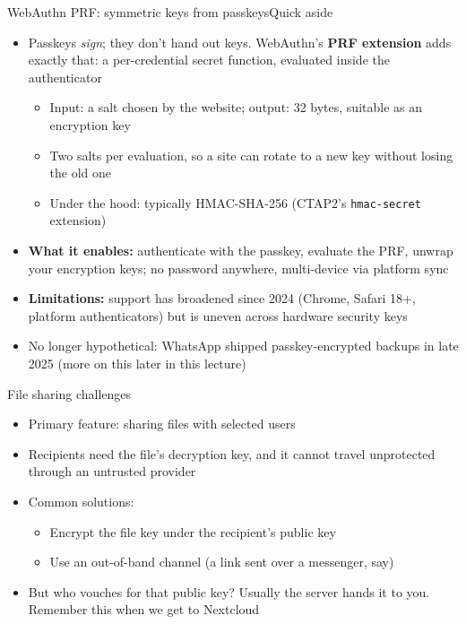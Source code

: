 \ifdefined\PRESENTATION\else\PassOptionsToClass{handout}{beamer}\fi\documentclass[aspectratio=169, lualatex]{beamer}
\begin{document}
\begin{frame}{WebAuthn PRF: symmetric keys from passkeys}{Quick aside}
	\begin{itemize}
		\item Passkeys \textit{sign}; they don't hand out keys. WebAuthn's \textbf{PRF extension} adds exactly that: a per-credential secret function, evaluated inside the authenticator
		      \begin{itemize}
			      \item Input: a salt chosen by the website; output: 32 bytes, suitable as an encryption key
			      \item Two salts per evaluation, so a site can rotate to a new key without losing the old one
			      \item Under the hood: typically HMAC-SHA-256 (CTAP2's \texttt{hmac-secret} extension)
		      \end{itemize}
		\item \textbf{What it enables:} authenticate with the passkey, evaluate the PRF, unwrap your encryption keys; no password anywhere, multi-device via platform sync
		\item \textbf{Limitations:} support has broadened since 2024 (Chrome, Safari 18+, platform authenticators) but is uneven across hardware security keys
		\item No longer hypothetical: WhatsApp shipped passkey-encrypted backups in late 2025 (more on this later in this lecture)
	\end{itemize}
\end{frame}

\begin{frame}{File sharing challenges}
	\begin{itemize}
		\item Primary feature: sharing files with selected users
		\item Recipients need the file's decryption key, and it cannot travel unprotected through an untrusted provider
		\item Common solutions:
		      \begin{itemize}
			      \item Encrypt the file key under the recipient's public key
			      \item Use an out-of-band channel (a link sent over a messenger, say)
		      \end{itemize}
		\item But who vouches for that public key? Usually the server hands it to you. Remember this when we get to Nextcloud
	\end{itemize}
\end{frame}
\end{document}
